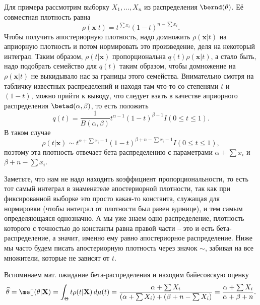 Для примера рассмотрим выборку $X_1, \ldots, X_n$ из распределения $\bernd(\theta)$. Её совместная плотность равна
\[
\rho(\mathbf{x} | t) = t^{\sum x_i} (1 - t)^{n - \sum x_i}.
\]
Чтобы получить апостериорную плотность, надо домножить $\rho(\mathbf{x} | t)$ на априорную плотность и потом нормировать это произведение, деля на некоторый интеграл. Таким образом, $\rho(t | \mathbf{x})$ пропорциональна $q(t) \rho(\mathbf{x} | t)$, а стало быть, надо подобрать семейство для $q(t)$ таким образом, чтобы домножение на $\rho(\mathbf{x} | t)$ не выкидывало нас за границы этого семейства. Внимательно смотря на табличку известных распределений и находя там что-то со степенями $t$ и $(1 - t)$, можно прийти к выводу, что следует взять в качестве априорного распределения $\betad(\alpha, \beta)$, то есть положить
\[
q(t) = \frac{1}{B(\alpha, \beta)}t^{\alpha-1}(1-t)^{\beta-1} I(0 \le t \le 1).
\]
В таком случае
\[
\rho(t | \mathbf{x}) \sim t^{\alpha + \sum x_i - 1} (1-t)^{\beta + n - \sum x_i - 1} I(0 \le t \le 1),
\]
поэтому эта плотность отвечает бета-распределению с параметрами $\alpha + \sum x_i$ и $\beta + n - \sum x_i$.

Заметьте, что нам не надо находить коэффициент пропорциональности, то есть тот самый интеграл в знаменателе апостериорной плотности, так как при фиксированной выборке это просто какая-то константа, служащая для нормировки (чтобы интеграл от плотности был равен единице), и тем самым определяющаяся однозначно. А мы уже знаем одно распределение, плотность которого с точностью до константы равна правой части -- это и есть бета-распределение, а значит, именно ему равно апостериорное распределение. Ниже мы часто будем писать апостериорную плотность через значок $\sim$, забивая на все множители, которые не зависят от $t$.

Вспоминаем мат. ожидание бета-распределения и находим байесовскую оценку
\[
\widehat{\theta} = \me[] (\theta | \mathbf X) = \int_{\Theta} t \rho(t | \mathbf X)\,d\mu(t) = \frac{\alpha + \sum X_i}{\left(\alpha + \sum X_i\right) + \left(\beta + n - \sum X_i\right)} = \frac{\alpha + \sum X_i}{\alpha + \beta + n}.
\]


